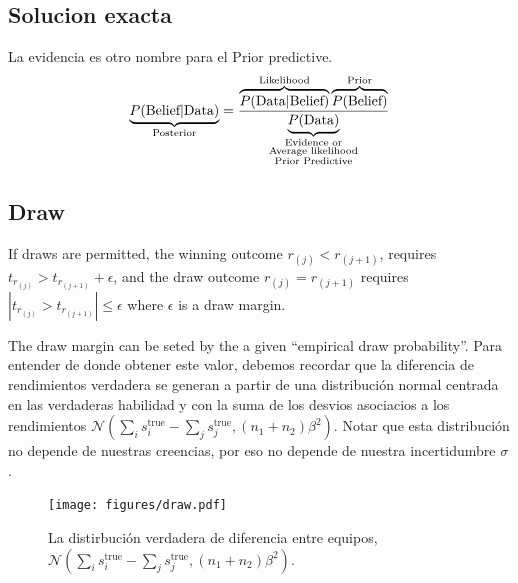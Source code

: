 \documentclass[article]{jss}
\newcommand{\N}{\mathcal{N}}
\newcommand\hfrac[2]{\genfrac{}{}{0pt}{}{#1}{#2}} %
\begin{document}
\subsection{Solucion exacta}



La evidencia es otro nombre para el Prior predictive.
%
\begin{equation*}
\underbrace{P(\text{Belief}|\text{Data})}_{\text{\scriptsize Posterior}} = \frac{\overbrace{P(\text{Data}|\text{Belief})}^{\text{\scriptsize Likelihood}} \overbrace{P(\text{Belief})}^{\text{\scriptsize Prior}} }{\underbrace{P(\text{Data})}_{\hfrac{\hfrac{\text{\scriptsize Evidence or}}{\text{\scriptsize Average likelihood}}}{\text{\scriptsize Prior Predictive}} } }
\end{equation*}




\subsection{Draw}

If draws are permitted, the winning outcome $r_{(j)} < r_{(j+1)}$, requires $t_{r_{(j)}} > t_{r_{(j+1)}} + \epsilon$, and the draw outcome $r_{(j)}=r_{(j+1)}$ requires $|t_{r_{(j)}} > t_{r_{(j+1)}}| \leq \epsilon$ where $\epsilon$ is a draw margin.

\vspace{0.3cm}

The draw margin can be seted by the a given ``empirical draw probability''.
Para entender de donde obtener este valor, debemos recordar que la diferencia de rendimientos verdadera se generan a partir de una distribuci\'on normal centrada en las verdaderas habilidad y con la suma de los desvios asociacios a los rendimientos $\N( \sum_i s_i^{\text{true}} - \sum_j s_j^{\text{true}},(n_1+n_2)\beta^2)$.
Notar que esta distribuci\'on no depende de nuestras creencias, por eso no depende de nuestra incertidumbre $\sigma$. 

\begin{figure}[H]
\centering
  \texttt{[image: figures/draw.pdf]}
  \caption{La distirbuci\'on verdadera de diferencia entre equipos, $\N( \sum_i s_i^{\text{true}} - \sum_j s_j^{\text{true}},(n_1+n_2)\beta^2)$.}
  \label{fig:draw}
\end{figure}
\end{document}
